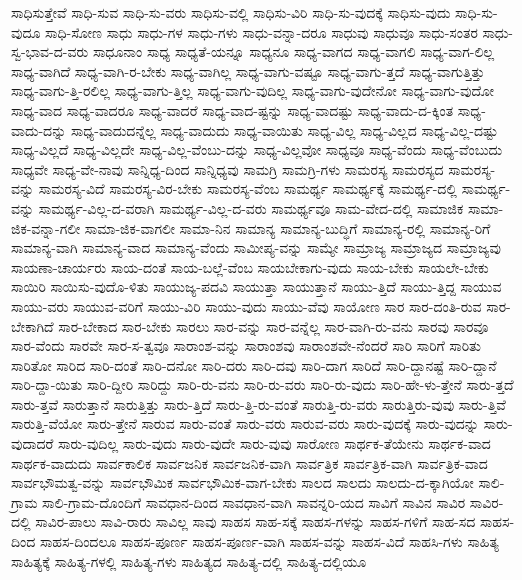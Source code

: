 {ಸಾಧಿಸುತ್ತೇವೆ
ಸಾಧಿ-ಸುವ
ಸಾಧಿ-ಸು-ವರು
ಸಾಧಿಸು-ವಲ್ಲಿ
ಸಾಧಿಸು-ವಿರಿ
ಸಾಧಿ-ಸು-ವುದಕ್ಕೆ
ಸಾಧಿಸು-ವುದು
ಸಾಧಿ-ಸು-ವುದೂ
ಸಾಧಿ-ಸೋಣ
ಸಾಧು
ಸಾಧು-ಗಳ
ಸಾಧು-ಗಳು
ಸಾಧು-ವನ್ನಾ-ದರೂ
ಸಾಧುವು
ಸಾಧುವೂ
ಸಾಧು-ಸಂತರ
ಸಾಧು-ಸ್ವ-ಭಾವ-ದ-ವರು
ಸಾಧೂನಾಂ
ಸಾಧ್ಯ
ಸಾಧ್ಯತೆ-ಯನ್ನೂ
ಸಾಧ್ಯನೂ
ಸಾಧ್ಯ-ವಾಗದ
ಸಾಧ್ಯ-ವಾಗಲಿ
ಸಾಧ್ಯ-ವಾಗ-ಲಿಲ್ಲ
ಸಾಧ್ಯ-ವಾಗಿದೆ
ಸಾಧ್ಯ-ವಾಗಿ-ರ-ಬೇಕು
ಸಾಧ್ಯ-ವಾಗಿಲ್ಲ
ಸಾಧ್ಯ-ವಾಗು-ವಷ್ಟೂ
ಸಾಧ್ಯ-ವಾಗು-ತ್ತದೆ
ಸಾಧ್ಯ-ವಾಗುತ್ತಿತ್ತು
ಸಾಧ್ಯ-ವಾಗು-ತ್ತಿ-ರಲಿಲ್ಲ
ಸಾಧ್ಯ-ವಾಗು-ತ್ತಿಲ್ಲ
ಸಾಧ್ಯ-ವಾಗು-ವುದಿಲ್ಲ
ಸಾಧ್ಯ-ವಾಗು-ವುದೇನೋ
ಸಾಧ್ಯ-ವಾಗು-ವುದೋ
ಸಾಧ್ಯ-ವಾದ
ಸಾಧ್ಯ-ವಾದರೂ
ಸಾಧ್ಯ-ವಾದರೆ
ಸಾಧ್ಯ-ವಾದ-ಷ್ಟನ್ನು
ಸಾಧ್ಯ-ವಾದಷ್ಟು
ಸಾಧ್ಯ-ವಾದು-ದ-ಕ್ಕಿಂತ
ಸಾಧ್ಯ-ವಾದು-ದನ್ನು
ಸಾಧ್ಯ-ವಾದುದನ್ನೆಲ್ಲ
ಸಾಧ್ಯ-ವಾದುದು
ಸಾಧ್ಯ-ವಾಯಿತು
ಸಾಧ್ಯ-ವಿಲ್ಲ
ಸಾಧ್ಯ-ವಿಲ್ಲದ
ಸಾಧ್ಯ-ವಿಲ್ಲ-ದಷ್ಟು
ಸಾಧ್ಯ-ವಿಲ್ಲದೆ
ಸಾಧ್ಯ-ವಿಲ್ಲದೇ
ಸಾಧ್ಯ-ವಿಲ್ಲ-ವೆಂಬು-ದನ್ನು
ಸಾಧ್ಯ-ವಿಲ್ಲವೋ
ಸಾಧ್ಯವೂ
ಸಾಧ್ಯ-ವೆಂದು
ಸಾಧ್ಯ-ವೆಂಬುದು
ಸಾಧ್ಯವೇ
ಸಾಧ್ಯ-ವೇ-ನಾವು
ಸಾನ್ನಿಧ್ಯ-ದಿಂದ
ಸಾನ್ನಿಧ್ಯವು
ಸಾಮಗ್ರಿ
ಸಾಮಗ್ರಿ-ಗಳು
ಸಾಮರಸ್ಯ
ಸಾಮರಸ್ಯದ
ಸಾಮರಸ್ಯ-ವನ್ನು
ಸಾಮರಸ್ಯ-ವಿದೆ
ಸಾಮರಸ್ಯ-ವಿರ-ಬೇಕು
ಸಾಮರಸ್ಯ-ವೆಂಬ
ಸಾಮರ್ಥ್ಯ
ಸಾಮರ್ಥ್ಯಕ್ಕೆ
ಸಾಮರ್ಥ್ಯ-ದಲ್ಲಿ
ಸಾಮರ್ಥ್ಯ-ವನ್ನು
ಸಾಮರ್ಥ್ಯ-ವಿಲ್ಲ-ದ-ವರಾಗಿ
ಸಾಮರ್ಥ್ಯ-ವಿಲ್ಲ-ದ-ವರು
ಸಾಮರ್ಥ್ಯವೂ
ಸಾಮ-ವೇದ-ದಲ್ಲಿ
ಸಾಮಾಜಿಕ
ಸಾಮಾ-ಜಿಕ-ವನ್ನಾ-ಗಲೀ
ಸಾಮಾ-ಜಿಕ-ವಾಗಲೀ
ಸಾಮಾ-ನಿನ
ಸಾಮಾನ್ಯ
ಸಾಮಾನ್ಯ-ಬುದ್ಧಿಗೆ
ಸಾಮಾನ್ಯ-ರಲ್ಲಿ
ಸಾಮಾನ್ಯ-ರಿಗೆ
ಸಾಮಾನ್ಯ-ವಾಗಿ
ಸಾಮಾನ್ಯ-ವಾದ
ಸಾಮಾನ್ಯ-ವೆಂದು
ಸಾಮೀಪ್ಯ-ವನ್ನು
ಸಾಮ್ಯೇ
ಸಾಮ್ರಾಜ್ಯ
ಸಾಮ್ರಾಜ್ಯದ
ಸಾಮ್ರಾಜ್ಯವು
ಸಾಯಣಾ-ಚಾರ್ಯರು
ಸಾಯ-ದಂತೆ
ಸಾಯ-ಬಲ್ಲೆ-ವೆಂಬ
ಸಾಯಬೇಕಾಗು-ವುದು
ಸಾಯ-ಬೇಕು
ಸಾಯಲೇ-ಬೇಕು
ಸಾಯಿರಿ
ಸಾಯಿಸು-ವುದೊ-ಳಿತು
ಸಾಯುಜ್ಯ-ಪದವಿ
ಸಾಯುತ್ತಾ
ಸಾಯುತ್ತಾನೆ
ಸಾಯು-ತ್ತಿದೆ
ಸಾಯು-ತ್ತಿದ್ದ
ಸಾಯುವ
ಸಾಯು-ವರು
ಸಾಯುವ-ವರಿಗೆ
ಸಾಯು-ವಿರಿ
ಸಾಯು-ವುದು
ಸಾಯು-ವೆವು
ಸಾಯೋಣ
ಸಾರ
ಸಾರ-ದಂತಿ-ರುವ
ಸಾರ-ಬೇಕಾಗಿದೆ
ಸಾರ-ಬೇಕಾದ
ಸಾರ-ಬೇಕು
ಸಾರಲು
ಸಾರ-ವನ್ನು
ಸಾರ-ವನ್ನೆಲ್ಲ
ಸಾರ-ವಾಗಿ-ರು-ವನು
ಸಾರವು
ಸಾರವೂ
ಸಾರ-ವೆಂದು
ಸಾರವೇ
ಸಾರ-ಸ-ತ್ವವೂ
ಸಾರಾಂಶ-ವನ್ನು
ಸಾರಾಂಶವು
ಸಾರಾಂಶವೇ-ನೆಂದರೆ
ಸಾರಿ
ಸಾರಿಗೆ
ಸಾರಿತು
ಸಾರಿತೋ
ಸಾರಿದ
ಸಾರಿ-ದಂತೆ
ಸಾರಿ-ದನೋ
ಸಾರಿ-ದರು
ಸಾರಿ-ದವು
ಸಾರಿ-ದಾಗ
ಸಾರಿದೆ
ಸಾರಿ-ದ್ದಾನಷ್ಟೆ
ಸಾರಿ-ದ್ದಾನೆ
ಸಾರಿ-ದ್ದಾ-ಯಿತು
ಸಾರಿ-ದ್ದೀರಿ
ಸಾರಿದ್ದು
ಸಾರಿ-ರು-ವನು
ಸಾರಿ-ರು-ವರು
ಸಾರಿ-ರು-ವುದು
ಸಾರಿ-ಹೇ-ಳು-ತ್ತೇನೆ
ಸಾರು-ತ್ತದೆ
ಸಾರು-ತ್ತವೆ
ಸಾರುತ್ತಾನೆ
ಸಾರುತ್ತಿತ್ತು
ಸಾರು-ತ್ತಿದೆ
ಸಾರು-ತ್ತಿ-ರು-ವಂತೆ
ಸಾರುತ್ತಿ-ರು-ವರು
ಸಾರುತ್ತಿರು-ವುವು
ಸಾರು-ತ್ತಿವೆ
ಸಾರುತ್ತಿ-ವೆಯೋ
ಸಾರು-ತ್ತೇನೆ
ಸಾರುವ
ಸಾರು-ವಂತೆ
ಸಾರು-ವರು
ಸಾರುವ-ವರು
ಸಾರು-ವುದಕ್ಕೆ
ಸಾರು-ವುದನ್ನು
ಸಾರು-ವುದಾದರೆ
ಸಾರು-ವುದಿಲ್ಲ
ಸಾರು-ವುದು
ಸಾರು-ವುದೇ
ಸಾರು-ವುವು
ಸಾರೋಣ
ಸಾರ್ಥಕ-ತೆಯೇನು
ಸಾರ್ಥಕ-ವಾದ
ಸಾರ್ಥಕ-ವಾದುದು
ಸಾರ್ವಕಾಲಿಕ
ಸಾರ್ವಜನಿಕ
ಸಾರ್ವಜನಿಕ-ವಾಗಿ
ಸಾರ್ವತ್ರಿಕ
ಸಾರ್ವತ್ರಿಕ-ವಾಗಿ
ಸಾರ್ವತ್ರಿಕ-ವಾದ
ಸಾರ್ವಭೌಮತ್ವ-ವನ್ನು
ಸಾರ್ವಭೌಮಿಕ
ಸಾರ್ವಭೌಮಿಕ-ವಾಗ-ಬೇಕು
ಸಾಲದ
ಸಾಲದು
ಸಾಲದು-ದ-ಕ್ಕಾಗಿಯೋ
ಸಾಲಿ-ಗ್ರಾಮ
ಸಾಲಿ-ಗ್ರಾಮ-ದೊಂದಿಗೆ
ಸಾವಧಾನ-ದಿಂದ
ಸಾವಧಾನ-ವಾಗಿ
ಸಾವನ್ನರಿ-ಯದ
ಸಾವಿಗೆ
ಸಾವಿನ
ಸಾವಿರ
ಸಾವಿರ-ದಲ್ಲಿ
ಸಾವಿರ-ಪಾಲು
ಸಾವಿ-ರಾರು
ಸಾವಿಲ್ಲ
ಸಾವು
ಸಾಹಸ
ಸಾಹ-ಸಕ್ಕೆ
ಸಾಹಸ-ಗಳನ್ನು
ಸಾಹಸ-ಗಳಿಗೆ
ಸಾಹ-ಸದ
ಸಾಹಸ-ದಿಂದ
ಸಾಹಸ-ದಿಂದಲೂ
ಸಾಹಸ-ಪೂರ್ಣ
ಸಾಹಸ-ಪೂರ್ಣ-ವಾಗಿ
ಸಾಹಸ-ವನ್ನು
ಸಾಹಸ-ವಿದೆ
ಸಾಹಸಿ-ಗಳು
ಸಾಹಿತ್ಯ
ಸಾಹಿತ್ಯಕ್ಕೆ
ಸಾಹಿತ್ಯ-ಗಳಲ್ಲಿ
ಸಾಹಿತ್ಯ-ಗಳು
ಸಾಹಿತ್ಯದ
ಸಾಹಿತ್ಯ-ದಲ್ಲಿ
ಸಾಹಿತ್ಯ-ದಲ್ಲಿಯೂ
}
